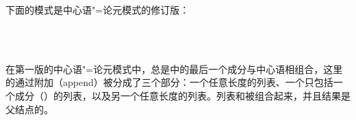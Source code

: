 下面的模式是中心语"=论元模式的修订版：
\begin{samepage}
\begin{schema}
\label{schema-bin-prel2}
~\\
 \impl\\
\end{schema}
\end{samepage}
在第一版的中心语"=论元模式中，总是\subcatlc 中的最后一个成分与中心语相组合，这里的\subcatlc 通过附加（append）被分成了三个部分：一个任意长度的列表、一个只包括一个成分（）的列表，以及另一个任意长度的列表。列表和被组合起来，并且结果是父结点的\subcatvc。
